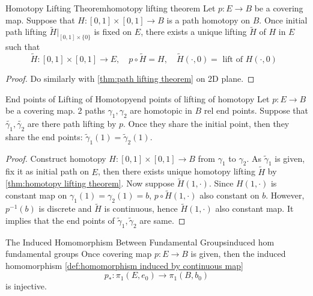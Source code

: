 \documentclass[12pt, a4paper, twoside]{article}
\theoremstyle{plain}
\begin{document}
\begin{thm}{Homotopy Lifting Theorem}{homotopy lifting theorem}
    Let $p: E \rightarrow B$ be a covering map. Suppose that $H: [0,1] \times [0,1] \rightarrow B$ 
    is a path homotopy on $B$. Once initial path lifting $\tilde{H}|_{[0,1] \times \{0\}}$ is fixed on $E$, 
    there exists a unique lifting $\tilde{H}$ of $H$ in $E$ such that 
    \[\tilde{H}: [0,1] \times [0,1] \rightarrow E, \quad p \circ \tilde{H} = H, \quad \tilde{H}(\cdot, 0) = \text{ lift of $H(\cdot, 0)$ }\]
\end{thm}

\begin{proof}
    Do similarly with \ref{thm:path lifting theorem} on 2D plane.
\end{proof}

\begin{cor}{End points of Lifting of Homotopy}{end points of lifting of homotopy}
    Let $p: E \rightarrow B$ be a covering map. 
    2 paths $\gamma_1, \gamma_2$ are homotopic in $B$ rel end points. 
    Suppose that $\tilde{\gamma_1}, \tilde{\gamma_2}$ are there path lifting by $p$. 
    Once they share the initial point, then they share the end points: $\tilde{\gamma}_1(1) = \tilde{\gamma}_2(1)$. 
\end{cor}

\begin{proof}
    Construct homotopy $H: [0,1] \times [0,1] \rightarrow B$ from $\gamma_1$ to $\gamma_2$. 
    As $\tilde{\gamma}_1$ is given, fix it as initial path on $E$, then there exists unique 
    homotopy lifting $\tilde{H}$ by \ref{thm:homotopy lifting theorem}. 
    Now suppose $\tilde{H}(1, \cdot)$. Since $H(1, \cdot)$ is constant map on $\gamma_1(1) = \gamma_2(1) = b$, 
    $p \circ \tilde{H}(1, \cdot)$ also constant on $b$. 
    However, $p^{-1}(b)$ is discrete and $\tilde{H}$ is continuous, hence $\tilde{H}(1, \cdot)$ also constant map. 
    It implies that the end points of $\tilde{\gamma}_1, \tilde{\gamma}_2$ are same. 
\end{proof}

\newpage

\begin{cor}{The Induced Homomorphism Between Fundamental Groups}{induced hom fundamental groups}
    Once covering map $p: E \rightarrow B$ is given, then the induced homomorphism \ref{def:homomorphism induced by continuous map}
    \[p_*: \pi_1(E, e_0) \rightarrow \pi_1(B, b_0)\]
    is injective. 
\end{cor}
\end{document}
